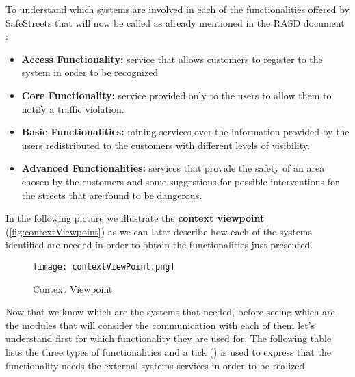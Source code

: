 			To understand which systems are involved in each of the functionalities offered by SafeStreets that will now be called as already mentioned in the RASD document \cite{RASD}:
			
			\begin{itemize}
				\item \textbf{Access Functionality:} service that allows customers to register to the system in order to be recognized
				\item \textbf{Core Functionality:} service provided only to the users to allow them to notify a traffic violation.
				\item \textbf{Basic Functionalities:} mining services over the information provided by the users redistributed to the customers with different levels of visibility.
				\item \textbf{Advanced Functionalities:} services that provide the safety of an area chosen by the customers and some suggestions for possible interventions for the streets that are found to be dangerous.
			\end{itemize}
		
			In the following picture we illustrate the \textbf{context viewpoint} (\autoref{fig:contextViewpoint}) as we can later describe how each of the systems identified are needed in order to obtain the functionalities just presented.
			
			\newpage
			
			\begin{figure}[ht]
				\centering
				\texttt{[image: contextViewPoint.png]}
				\caption{\label{fig:contextViewpoint} Context Viewpoint}
			\end{figure}
		
			Now that we know which are the systems that needed, before seeing which are the modules that will consider the communication with each of them let's understand first for which functionality they are used for. The following table lists the three types of functionalities and a tick (\xtick) is used to express that the functionality needs the external systems services in order to be realized.
			
			\begin{center}
				 
			\end{center}
		
